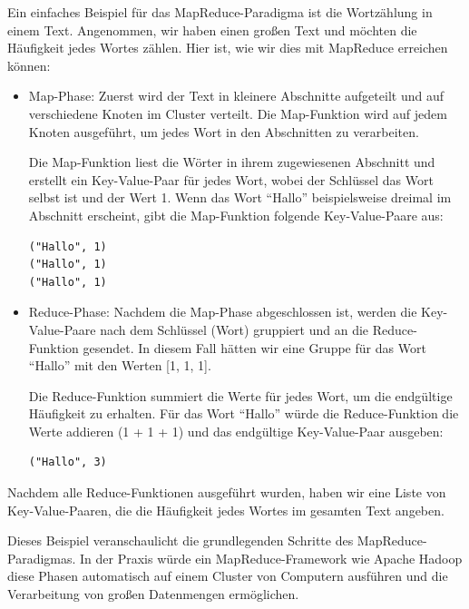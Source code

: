Ein einfaches Beispiel für das MapReduce-Paradigma ist die Wortzählung in einem Text. Angenommen, wir haben einen großen Text und möchten die Häufigkeit jedes Wortes zählen. Hier ist, wie wir dies mit MapReduce erreichen können:
\begin{itemize} 
\item Map-Phase: Zuerst wird der Text in kleinere Abschnitte aufgeteilt und auf verschiedene Knoten im Cluster verteilt. Die Map-Funktion wird auf jedem Knoten ausgeführt, um jedes Wort in den Abschnitten zu verarbeiten.

Die Map-Funktion liest die Wörter in ihrem zugewiesenen Abschnitt und erstellt ein Key-Value-Paar für jedes Wort, wobei der Schlüssel das Wort selbst ist und der Wert 1. Wenn das Wort \enquote{Hallo} beispielsweise dreimal im Abschnitt erscheint, gibt die Map-Funktion folgende Key-Value-Paare aus:

\noindent\begin{minipage}{\textwidth}
\begin{lstlisting}[caption={Ausgabe},captionpos=b,label={lst:map}]
("Hallo", 1)
("Hallo", 1)
("Hallo", 1)
\end{lstlisting}
\end{minipage}

\item Reduce-Phase: Nachdem die Map-Phase abgeschlossen ist, werden die Key-Value-Paare nach dem Schlüssel (Wort) gruppiert und an die Reduce-Funktion gesendet. In diesem Fall hätten wir eine Gruppe für das Wort \enquote{Hallo} mit den Werten [1, 1, 1].

Die Reduce-Funktion summiert die Werte für jedes Wort, um die endgültige Häufigkeit zu erhalten. Für das Wort \enquote{Hallo} würde die Reduce-Funktion die Werte addieren (1 + 1 + 1) und das endgültige Key-Value-Paar ausgeben:
\noindent\begin{minipage}{\textwidth}
\begin{lstlisting}[caption={Ausgabe},captionpos=b,label={lst:map}]
("Hallo", 3)
\end{lstlisting}
\end{minipage}
\end{itemize}  

Nachdem alle Reduce-Funktionen ausgeführt wurden, haben wir eine Liste von Key-Value-Paaren, die die Häufigkeit jedes Wortes im gesamten Text angeben.

Dieses Beispiel veranschaulicht die grundlegenden Schritte des MapReduce-Paradigmas. In der Praxis würde ein MapReduce-Framework wie Apache Hadoop diese Phasen automatisch auf einem Cluster von Computern ausführen und die Verarbeitung von großen Datenmengen ermöglichen.
